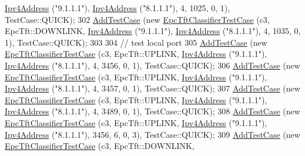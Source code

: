 \begin{DoxyCode}
      \hyperlink{classns3_1_1Ipv4Address}{Ipv4Address} (\textcolor{stringliteral}{"9.1.1.1"}), \hyperlink{classns3_1_1Ipv4Address}{Ipv4Address} (\textcolor{stringliteral}{"8.1.1.1"}),     4,     1025,     0,    1), 
      TestCase::QUICK);
302   \hyperlink{classns3_1_1TestCase_a3718088e3eefd5d6454569d2e0ddd835}{AddTestCase} (\textcolor{keyword}{new} \hyperlink{classEpcTftClassifierTestCase}{EpcTftClassifierTestCase} (c3, EpcTft::DOWNLINK, 
      \hyperlink{classns3_1_1Ipv4Address}{Ipv4Address} (\textcolor{stringliteral}{"9.1.1.1"}), \hyperlink{classns3_1_1Ipv4Address}{Ipv4Address} (\textcolor{stringliteral}{"8.1.1.1"}),     4,     1035,     0,    1), 
      TestCase::QUICK);
303 
304   \textcolor{comment}{// test local port}
305   \hyperlink{classns3_1_1TestCase_a3718088e3eefd5d6454569d2e0ddd835}{AddTestCase} (\textcolor{keyword}{new} \hyperlink{classEpcTftClassifierTestCase}{EpcTftClassifierTestCase} (c3, EpcTft::UPLINK,   
      \hyperlink{classns3_1_1Ipv4Address}{Ipv4Address} (\textcolor{stringliteral}{"9.1.1.1"}), \hyperlink{classns3_1_1Ipv4Address}{Ipv4Address} (\textcolor{stringliteral}{"8.1.1.1"}),     4,     3456,     0,    1), 
      TestCase::QUICK);
306   \hyperlink{classns3_1_1TestCase_a3718088e3eefd5d6454569d2e0ddd835}{AddTestCase} (\textcolor{keyword}{new} \hyperlink{classEpcTftClassifierTestCase}{EpcTftClassifierTestCase} (c3, EpcTft::UPLINK,   
      \hyperlink{classns3_1_1Ipv4Address}{Ipv4Address} (\textcolor{stringliteral}{"9.1.1.1"}), \hyperlink{classns3_1_1Ipv4Address}{Ipv4Address} (\textcolor{stringliteral}{"8.1.1.1"}),     4,     3457,     0,    1), 
      TestCase::QUICK);
307   \hyperlink{classns3_1_1TestCase_a3718088e3eefd5d6454569d2e0ddd835}{AddTestCase} (\textcolor{keyword}{new} \hyperlink{classEpcTftClassifierTestCase}{EpcTftClassifierTestCase} (c3, EpcTft::UPLINK,   
      \hyperlink{classns3_1_1Ipv4Address}{Ipv4Address} (\textcolor{stringliteral}{"9.1.1.1"}), \hyperlink{classns3_1_1Ipv4Address}{Ipv4Address} (\textcolor{stringliteral}{"8.1.1.1"}),     4,     3489,     0,    1), 
      TestCase::QUICK);
308   \hyperlink{classns3_1_1TestCase_a3718088e3eefd5d6454569d2e0ddd835}{AddTestCase} (\textcolor{keyword}{new} \hyperlink{classEpcTftClassifierTestCase}{EpcTftClassifierTestCase} (c3, EpcTft::UPLINK,   
      \hyperlink{classns3_1_1Ipv4Address}{Ipv4Address} (\textcolor{stringliteral}{"9.1.1.1"}), \hyperlink{classns3_1_1Ipv4Address}{Ipv4Address} (\textcolor{stringliteral}{"8.1.1.1"}),  3456,        6,     0,    3), 
      TestCase::QUICK);
309   \hyperlink{classns3_1_1TestCase_a3718088e3eefd5d6454569d2e0ddd835}{AddTestCase} (\textcolor{keyword}{new} \hyperlink{classEpcTftClassifierTestCase}{EpcTftClassifierTestCase} (c3, EpcTft::DOWNLINK, 

\end{DoxyCode}
